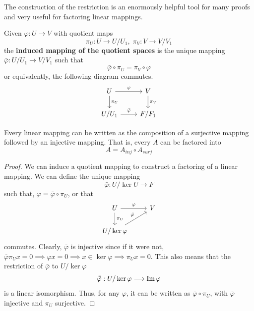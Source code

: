   The construction of the restriction is an enormously helpful tool for many proofs and very useful for factoring linear mappings. 

  \begin{definition}
    Given $\varphi: U \longrightarrow V$ with quotient maps 
    \begin{equation}
      \pi_U: U \longrightarrow U / U_1, \; \pi_V: V \longrightarrow V / V_1
    \end{equation}
    the \textbf{induced mapping of the quotient spaces} is the unique mapping $\bar{\varphi}: U/U_1 \longrightarrow V / V_1$ such that 
    \begin{equation}
      \bar{\varphi} \circ \pi_U = \pi_V \circ \varphi
    \end{equation}
    or equivalently, the following diagram commutes. 
    \[\begin{tikzcd}
        U \arrow{r}{\varphi} \arrow{d}{\pi_U} & V \arrow{d}{\pi_V}\\
        U / U_1 \arrow{r}{\bar{\varphi}} & F / F_1
    \end{tikzcd}\]
  \end{definition} 

  \begin{theorem}
    Every linear mapping can be written as the composition of a surjective mapping followed by an injective mapping. That is, every $A$ can be factored into 
    \begin{equation}
      A = A_{inj} \circ A_{surj}
    \end{equation}
  \end{theorem}
  \begin{proof}
    We can induce a quotient mapping to construct a factoring of a linear mapping. We can define the unique mapping 
    \begin{equation}
      \bar{\varphi}: U / \ker{U} \longrightarrow F
    \end{equation}
    such that, $\varphi = \bar{\varphi} \circ \pi_U$, or that 
    \[\begin{tikzcd}
       U \arrow{r}{\varphi} \arrow{d}{\pi_U} & V \\
       U / \ker{\varphi} \arrow{ru}{\bar{\varphi}}
    \end{tikzcd} \]
    commutes. Clearly, $\bar{\varphi}$ is injective since if it were not, $\bar{\varphi} \pi_U x = 0 \implies \varphi x = 0 \implies x \in \ker{\varphi} \implies \pi_U x = 0$. This also means that the restriction of $\bar{\varphi}$ to $U / \ker{\varphi}$
    \begin{equation}
      \bar{\bar{\varphi}}: U / \ker{\varphi} \longrightarrow \im{\varphi}
    \end{equation}
    is a linear isomorphism. Thus, for any $\varphi$, it can be written as $\bar{\varphi} \circ \pi_U$, with $\bar{\varphi}$ injective and $\pi_U$ surjective. 
  \end{proof}


